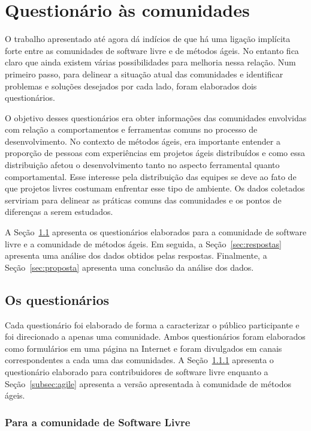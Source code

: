 \chapter{Questionário às comunidades}
\label{cap:pesquisas}

O trabalho apresentado até agora dá indícios de que há uma ligação
implícita forte entre as comunidades de software livre e de métodos
ágeis. No entanto fica claro que ainda existem várias possibilidades
para melhoria nessa relação. Num primeiro passo, para delinear a
situação atual das comunidades e identificar problemas e soluções
desejados por cada lado, foram elaborados dois questionários.

O objetivo desses questionários era obter informações das comunidades
envolvidas com relação a comportamentos e ferramentas comuns no
processo de desenvolvimento. No contexto de métodos ágeis, era
importante entender a proporção de pessoas com experiências em
projetos ágeis distribuídos e como essa distribuição afetou o
desenvolvimento tanto no aspecto ferramental quanto
comportamental. Esse interesse pela distribuição das equipes se deve
ao fato de que projetos livres costumam enfrentar esse tipo de
ambiente. Os dados coletados serviriam para delinear as práticas
comuns das comunidades e os pontos de diferenças a serem estudados.

A Seção~\ref{sec:questionarios} apresenta os questionários elaborados
para a comunidade de software livre e a comunidade de métodos
ágeis. Em seguida, a Seção~\ref{sec:respostas} apresenta uma análise
dos dados obtidos pelas respostas. Finalmente, a
Seção~\ref{sec:proposta} apresenta uma conclusão da análise dos dados.

\section{Os questionários}
\label{sec:questionarios}

Cada questionário foi elaborado de forma a caracterizar o público
participante e foi direcionado a apenas uma comunidade. Ambos
questionários foram elaborados como formulários em uma página na
Internet e foram divulgados em canais correspondentes a cada uma das
comunidades. A Seção~\ref{subsec:floss} apresenta o questionário
elaborado para contribuidores de software livre enquanto a
Seção~\ref{subsec:agile} apresenta a versão apresentada à comunidade
de métodos ágeis.

\subsection{Para a comunidade de Software Livre}
\label{subsec:floss}

